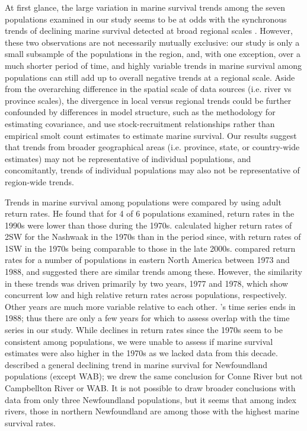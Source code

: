\documentclass[12pt]{article}
\begin{document}
At first glance, the large variation in marine survival trends among the seven
populations examined in our study seems to be at odds with the synchronous
trends of declining marine survival detected at broad regional scales
\citep{Olmos2019}. However, these two observations are not necessarily mutually
exclusive: our study is only a small subsample of the populations in the region,
and, with one exception, over a much shorter period of time,
and highly variable trends in marine survival among populations can still add
up to overall negative trends at a regional scale.
Aside from the overarching difference in the spatial scale of data sources
(i.e. river vs province scales), the divergence in local versus regional
trends could be further confounded by differences in model structure, such as
the methodology for estimating covariance, and use stock-recruitment
relationships rather than empirical smolt count estimates to estimate marine
survival.
Our results suggest that trends from broader geographical areas (i.e.
province, state, or country-wide estimates) may not be representative of
individual populations, and concomitantly, trends of individual populations
may also not be representative of region-wide trends.

Trends in marine survival
among populations were compared by \citet{Chaput2012a} using adult return rates.
He found that for 4 of 6 populations examined, return rates in the 1990s 
were lower than those during the 1970s.
\citet{Gibson2016} calculated higher return rates of 2SW for the Nashwaak in
the 1970s than in the period since, with return rates of 1SW in the 1970s
being comparable to those in the late 2000s.
\citet{Friedland1993} compared return rates for a number of populations in eastern
North America between 1973 and 1988, and suggested there are similar trends among these. 
However, the similarity in these trends was driven primarily by two years, 1977 and 1978, which
show concurrent low and high relative return rates across populations,
respectively. Other years are much more variable relative to each other.
\citeauthor{Friedland1993}'s \citeyear{Friedland1993} time series ends in  
1988; thus there are only a few years for which to assess overlap with the
time series in our study.
While declines in return rates since the 1970s seem to be consistent among
populations, we were unable to assess if marine survival estimates were also
higher in the 1970s as we lacked data from this decade.
\citet{Dempson2003} described a general declining trend in marine survival for
Newfoundland populations (except WAB); we drew the same conclusion for Conne
River but not Campbellton River or WAB. It is not possible to draw broader
conclusions with data from only three Newfoundland populations, but it seems
that among index rivers, those in northern Newfoundland are among those with
the highest marine survival rates.
\end{document}

